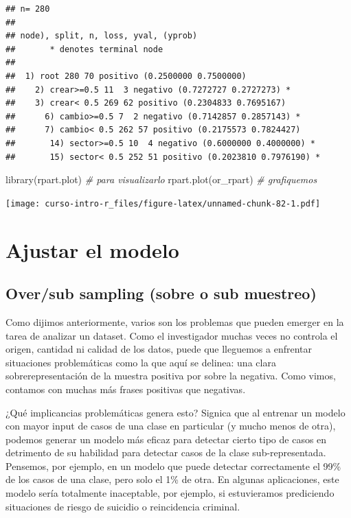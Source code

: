 \documentclass[
]{book}
\newenvironment{Shaded}{\begin{snugshade}}{\end{snugshade}}
\newcommand{\CommentTok}[1]{\textcolor[rgb]{0.56,0.35,0.01}{\textit{#1}}}
\newcommand{\FunctionTok}[1]{\textcolor[rgb]{0.00,0.00,0.00}{#1}}
\newcommand{\NormalTok}[1]{#1}
\begin{document}
\begin{verbatim}
## n= 280 
## 
## node), split, n, loss, yval, (yprob)
##       * denotes terminal node
## 
##  1) root 280 70 positivo (0.2500000 0.7500000)  
##    2) crear>=0.5 11  3 negativo (0.7272727 0.2727273) *
##    3) crear< 0.5 269 62 positivo (0.2304833 0.7695167)  
##      6) cambio>=0.5 7  2 negativo (0.7142857 0.2857143) *
##      7) cambio< 0.5 262 57 positivo (0.2175573 0.7824427)  
##       14) sector>=0.5 10  4 negativo (0.6000000 0.4000000) *
##       15) sector< 0.5 252 51 positivo (0.2023810 0.7976190) *
\end{verbatim}

\begin{Shaded}
\begin{Highlighting}[]
\FunctionTok{library}\NormalTok{(rpart.plot) }\CommentTok{\# para visualizarlo }
\FunctionTok{rpart.plot}\NormalTok{(or\_rpart) }\CommentTok{\# grafiquemos}
\end{Highlighting}
\end{Shaded}

\texttt{[image: curso-intro-r\_files/figure-latex/unnamed-chunk-82-1.pdf]}

\hypertarget{ajustar-el-modelo}{%
\section{Ajustar el modelo}\label{ajustar-el-modelo}}

\hypertarget{oversub-sampling-sobre-o-sub-muestreo}{%
\subsection{Over/sub sampling (sobre o sub muestreo)}\label{oversub-sampling-sobre-o-sub-muestreo}}

Como dijimos anteriormente, varios son los problemas que pueden emerger en la tarea de analizar un dataset.
Como el investigador muchas veces no controla el origen, cantidad ni calidad de los datos, puede que lleguemos a enfrentar situaciones problemáticas como la que aquí se delinea: una clara sobrerepresentación de la muestra positiva por sobre la negativa. Como vimos, contamos con muchas más frases positivas que negativas.

¿Qué implicancias problemáticas genera esto? Signica que al entrenar un modelo con mayor input de casos de una clase en particular (y mucho menos de otra), podemos generar un modelo más eficaz para detectar cierto tipo de casos en detrimento de su habilidad para detectar casos de la clase sub-representada. Pensemos, por ejemplo, en un modelo que puede detectar correctamente el 99\% de los casos de una clase, pero solo el 1\% de otra. En algunas aplicaciones, este modelo sería totalmente inaceptable, por ejemplo, si estuvieramos prediciendo situaciones de riesgo de suicidio o reincidencia criminal.
\end{document}
